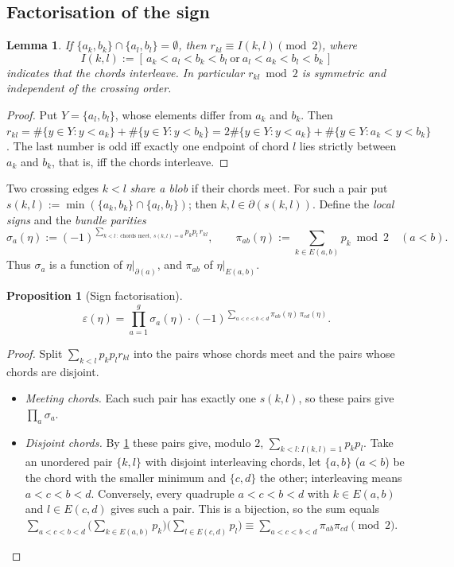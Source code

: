 \documentclass[11pt]{amsart}
\theoremstyle{plain}
\newtheorem{lemma}[theorem]{Lemma}
\newtheorem{proposition}[theorem]{Proposition}
\theoremstyle{definition}
\theoremstyle{remark}
\numberwithin{equation}{section}
\newcommand{\Ind}[1]{[\,#1\,]}
\begin{document}
\subsection{Factorisation of the sign}

\begin{lemma}\label{lem:disjoint-chords}
If $\{a_k,b_k\}\cap\{a_l,b_l\}=\emptyset$, then $r_{kl}\equiv I(k,l)\pmod 2$, where
\[
  I(k,l):=\Ind{a_k<a_l<b_k<b_l\ \text{or}\ a_l<a_k<b_l<b_k}
\]
indicates that the chords interleave. In particular $r_{kl}\bmod 2$ is symmetric and independent
of the crossing order.
\end{lemma}

\begin{proof}
Put $Y=\{a_l,b_l\}$, whose elements differ from $a_k$ and $b_k$. Then
$r_{kl}=\#\{y\in Y: y<a_k\}+\#\{y\in Y: y<b_k\}=2\#\{y\in Y: y<a_k\}+\#\{y\in Y: a_k<y<b_k\}$. The
last number is odd iff exactly one endpoint of chord $l$ lies strictly between $a_k$ and $b_k$,
that is, iff the chords interleave.
\end{proof}

Two crossing edges $k<l$ \emph{share a blob} if their chords meet. For such a pair put
$s(k,l):=\min(\{a_k,b_k\}\cap\{a_l,b_l\})$; then $k,l\in\partial(s(k,l))$. Define the \emph{local
signs} and the \emph{bundle parities}
\[
  \sigma_a(\eta):=(-1)^{\sum_{k<l\,:\ \text{chords meet},\ s(k,l)=a}p_kp_l\,r_{kl}},\qquad
  \pi_{ab}(\eta):=\sum_{k\in E(a,b)}p_k\bmod 2\quad(a<b).
\]
Thus $\sigma_a$ is a function of $\eta|_{\partial(a)}$, and $\pi_{ab}$ of $\eta|_{E(a,b)}$.

\begin{proposition}[Sign factorisation]\label{prop:sign-factor}
\[
  \varepsilon(\eta)=\prod_{a=1}^{g}\sigma_a(\eta)\cdot(-1)^{\sum_{a<c<b<d}\pi_{ab}(\eta)\,\pi_{cd}(\eta)} .
\]
\end{proposition}

\begin{proof}
Split $\sum_{k<l}p_kp_lr_{kl}$ into the pairs whose chords meet and the pairs whose chords are
disjoint.
\begin{itemize}
\item \emph{Meeting chords.} Each such pair has exactly one $s(k,l)$, so these pairs give
$\prod_a\sigma_a$.
\item \emph{Disjoint chords.} By \cref{lem:disjoint-chords} these pairs give, modulo $2$,
$\sum_{k<l\colon I(k,l)=1}p_kp_l$. Take an unordered pair $\{k,l\}$ with disjoint interleaving
chords, let $\{a,b\}$ ($a<b$) be the chord with the smaller minimum and $\{c,d\}$ the other;
interleaving means $a<c<b<d$. Conversely, every quadruple $a<c<b<d$ with $k\in E(a,b)$ and $l\in
E(c,d)$ gives such a pair. This is a bijection, so the sum equals
$\sum_{a<c<b<d}\bigl(\sum_{k\in E(a,b)}p_k\bigr)\bigl(\sum_{l\in E(c,d)}p_l\bigr)\equiv
\sum_{a<c<b<d}\pi_{ab}\pi_{cd}\pmod2$.\qedhere
\end{itemize}
\end{proof}
\end{document}
